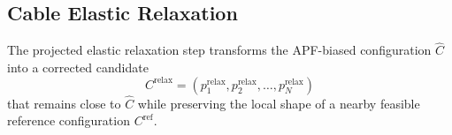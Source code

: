 \documentclass{pas}
\begin{document}





\subsection{Cable Elastic Relaxation}
\label{subsec:gcr_constrained_relaxation}

The projected elastic relaxation step transforms the APF-biased configuration
\(\widehat{C}\) into a corrected candidate
\[
C^{\mathrm{relax}}
=
(p_1^{\mathrm{relax}},p_2^{\mathrm{relax}},\ldots,p_N^{\mathrm{relax}})
\]
that remains close to \(\widehat{C}\) while preserving the local shape of a nearby feasible reference configuration \(C^{\mathrm{ref}}\).
\end{document}
